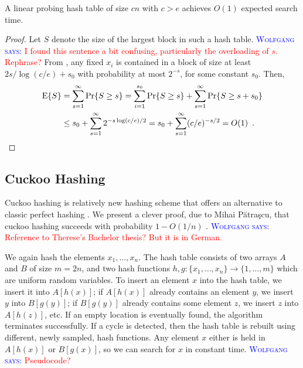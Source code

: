 \documentclass{patmorin}
\newcommand{\aremark}[3]{\textcolor{blue}{\textsc{#1 #2:}}
  \textcolor{red}{\textsf{#3}}}
\newcommand{\wolfgang}[2][says]{\aremark{Wolfgang}{#1}{#2}}
\begin{document}
\begin{cor}
  A linear probing hash table of size $cn$ with $c > e$ achieves
  $O(1)$ expected search time.
\end{cor}
\begin{proof}
  Let $S$ denote the size of the largest block in such a hash
  table. 
  \wolfgang{I found this sentence a bit confusing, particularly 
  the overloading of $s$. Rephrase?}
  From , any fixed $x_i$ is contained in
  a block of size at least $2s/\log (c/e) + s_0$ with probability at
  most $2^{-s}$, for some constant $s_0$. Then,
  \begin{align*}
    \operatorname{\mathrm{E}}\{S\} &= \sum_{s = 1}^\infty \Pr\{S \ge s\} = \sum_{i=1}^{s_0} \Pr\{S \ge s\} + \sum_{s = 1}^\infty \Pr\{S \ge s + s_0\} \\
            &\le s_0 + \sum_{s = 1}^\infty 2^{-s \log (c/e)/2} = s_0 + \sum_{s = 1}^\infty (c/e)^{-s/2} = O(1) \enspace . \qedhere
  \end{align*}
\end{proof}

\subsection{Cuckoo Hashing}

Cuckoo hashing is relatively new hashing scheme that offers an
alternative to classic perfect hashing \cite{pagh.rodler:cuckoo}. 
We present a clever proof, due to Mihai Pătraşcu, that cuckoo hashing
succeeds with probability $1-O(1/n)$ \cite{patrascu:cuckoo}.
\wolfgang{Reference to Therese's Bachelor thesis? But it is in
German.}


We again hash the elements $x_1, \ldots, x_n$. The hash table consists
of two arrays $A$ and $B$ of size $m = 2n$, and two hash functions $h,
g : \{x_1, \ldots, x_n\} \to \{1, \ldots, m\}$ which are uniform
random variables. To insert an element $x$ into the hash table, we
insert it into $A[h(x)]$; if $A[h(x)]$ already contains an element
$y$, we insert $y$ into $B[g(y)]$; if $B[g(y)]$ already contains some
element $z$, we insert $z$ into $A[h(z)]$, etc. If an empty location
is eventually found, the algorithm terminates successfully. If a cycle
is detected, then the hash table is rebuilt using different,
newly sampled, hash
functions. Any element $x$ either is held in $A[h(x)]$ or $B[g(x)]$,
so we can search for $x$ in constant time.
\wolfgang{Pseudocode?}
\end{document}
